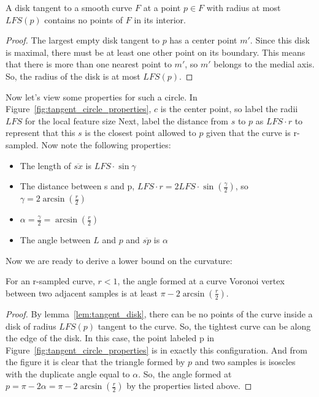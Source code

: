 \begin{lemma}
	A disk tangent to a smooth curve $F$ at a point $p\in F$ with radius at most $LFS(p)$ contains no points of $F$ in its interior.
	\label{lem:tangent_disk}
\end{lemma}

\begin{proof}
	The largest empty disk tangent to $p$ has a center point $m'$.
	Since this disk is maximal, there must be at least one other point on its boundary.
	This means that there is more than one nearest point to $m'$, so $m'$ belongs to the medial axis.
	So, the radius of the disk is at most $LFS(p)$.
\end{proof}



Now let's view some properties for such a circle.
In Figure~\ref{fig:tangent_circle_properties}, $c$ is the center point, so label the radii $LFS$ for the local feature size
Next, label the distance from $s$ to $p$ as $LFS\cdot r$ to represent that this $s$ is the closest point allowed to $p$ given that the curve is r-sampled.
Now note the following properties:
\begin{itemize}
	\item{The length of $\overline{sx}$ is $LFS\cdot \sin \gamma$ }
	\item{The distance between s and p, $LFS\cdot r = 2LFS\cdot\sin (\frac{\gamma}{2})$, so $\gamma = 2 \arcsin (\frac{r}{2}) $}
	\item{$\alpha = \frac{\gamma}{2} = \arcsin (\frac{r}{2})$ }
	\item{The angle between $L$ and $p$ and $\overline{sp}$ is $\alpha$}
\end{itemize}

Now we are ready to derive a lower bound on the curvature:
\begin{lemma}
	For an r-sampled curve, $r < 1$, the angle formed at a curve Voronoi vertex between two adjacent samples is at least $\pi - 2\arcsin(\frac{r}{2})$.
\end{lemma}

\begin{proof}
	By lemma~\ref{lem:tangent_disk}, there can be no points of the curve inside a disk of radius $LFS(p)$ tangent to the curve.
	So, the tightest curve can be along the edge of the disk.
	In this case, the point labeled p in Figure~\ref{fig:tangent_circle_properties} is in exactly this configuration.
	And from the figure it is clear that the triangle formed by $p$ and two samples is isoscles with the duplicate angle equal to $\alpha$.
	So, the angle formed at $p=\pi-2\alpha = \pi-2\arcsin(\frac{r}{2})$ by the properties listed above.
\end{proof}

